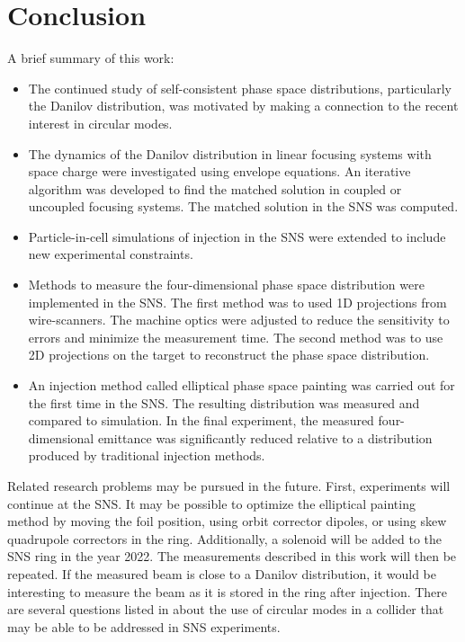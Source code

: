 \chapter{Conclusion} \label{chap-6}

A brief summary of this work:
%
\begin{itemize}
    \item The continued study of self-consistent phase space distributions, particularly the Danilov distribution, was motivated by making a connection to the recent interest in circular modes.
    \item The dynamics of the Danilov distribution in linear focusing systems with space charge were investigated using envelope equations. An iterative algorithm was developed to find the matched solution in coupled or uncoupled focusing systems. The matched solution in the SNS was computed.
    \item Particle-in-cell simulations of injection in the SNS were extended to include new experimental constraints. 
    \item Methods to measure the four-dimensional phase space distribution were implemented in the SNS. The first method was to used 1D projections from wire-scanners. The machine optics were adjusted to reduce the sensitivity to errors and minimize the measurement time. The second method was to use 2D projections on the target to reconstruct the phase space distribution. 
    \item An injection method called elliptical phase space painting was carried out for the first time in the SNS. The resulting distribution was measured and compared to simulation. In the final experiment, the measured four-dimensional emittance was significantly reduced relative to a distribution produced by traditional injection methods.
\end{itemize}
%

Related research problems may be pursued in the future. First, experiments will continue at the SNS. It may be possible to optimize the elliptical painting method by moving the foil position, using orbit corrector dipoles, or using skew quadrupole correctors in the ring. Additionally, a solenoid will be added to the SNS ring in the year 2022. The measurements described in this work will then be repeated. If the measured beam is close to a Danilov distribution, it would be interesting to measure the beam as it is stored in the ring after injection. There are several questions listed in \cite{Burov2013} about the use of circular modes in a collider that may be able to be addressed in SNS experiments.


